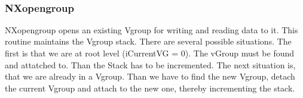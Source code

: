 \documentclass[12pt]{article}
\begin{document}
\begin{flushleft}
\begin{minipage}{\linewidth}
\begin{list}{}{}
\mbox{}\verb@     if(iRet < 0)@\\
\mbox{}@\\
\mbox{}\verb@     return NX_OK;@\\
\mbox{}\verb@   }@\\
\end{list}
\vspace{-1ex}
\footnotesize\addtolength{\baselineskip}{-1ex}
\end{minipage}\\[4ex]
\end{flushleft}
\subsubsection{NXopengroup}
NXopengroup opens an existing Vgroup for writing and reading data to it.
This routine maintains the Vgroup stack. There are several possible
situations. The first is that we are at root level (iCurrentVG = 0). The
vGroup must be found and attatched to. Than the Stack has to be incremented.
The next situation is, that we are already in a Vgroup. Than we have to find
the new Vgroup, detach the current Vgroup and attach to the new one, thereby
incrementing the stack.
\end{document}
